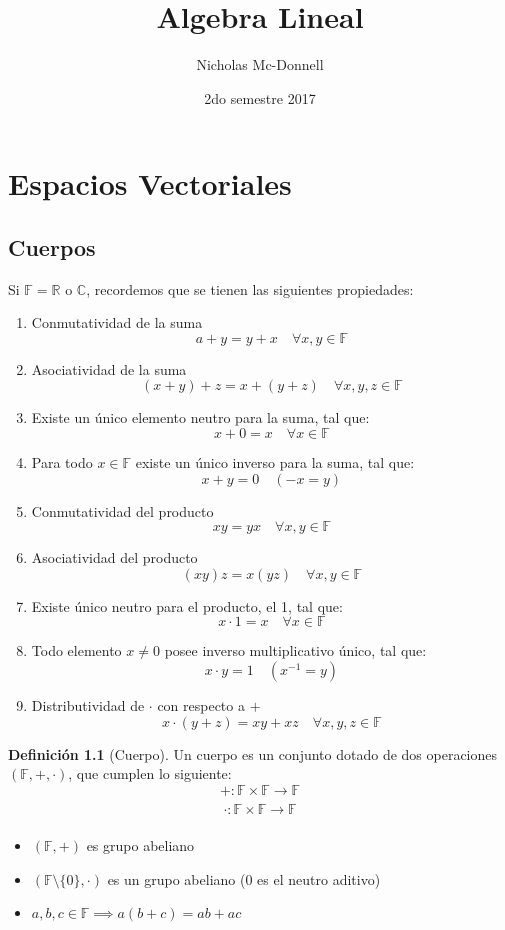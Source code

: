 \documentclass[11pt]{book}
\title{Algebra Lineal}
\author{Nicholas Mc-Donnell}
\date{2do semestre 2017}
\newcommand{\set}[1]{\mathbb{#1}}
\newcommand{\func}[5]{#1:#2\xrightarrow[#5]{#4}#3}
\theoremstyle{definition}
\newtheorem{defn}{Definición}[section]
\begin{document}
\maketitle
{}

\tableofcontents
{}
\chapter{Espacios Vectoriales}
\section{Cuerpos}
Si $\set{F}=\set{R}$ o $\set{C}$, recordemos que se tienen las siguientes propiedades:
\begin{enumerate}
	\item Conmutatividad de la suma
	      \[a+y=y+x\quad\forall x,y\in\set{F}\]

	\item Asociatividad de la suma
	      \[(x+y)+z=x+(y+z)\quad\forall x,y,z\in\set{F}\]

	\item Existe un único elemento neutro para la suma, tal que:
	      \[x+0=x\quad\forall x\in\set{F}\]

	\item Para todo $x\in\set{F}$ existe un único inverso para la suma, tal que:
	      \[x+y=0\quad (-x=y)\]

	\item Conmutatividad del producto
	      \[xy=yx\quad\forall x,y\in\set{F}\]

	\item Asociatividad del producto
	      \[(xy)z=x(yz)\quad\forall x,y\in\set{F}\]

	\item Existe único neutro para el producto, el 1, tal que:
	      \[x\cdot 1=x\quad\forall x\in\set{F}\]

	\item Todo elemento $x\neq 0$ posee inverso multiplicativo único, tal que:
	      \[x\cdot y=1\quad (x^{-1}=y)\]

	\item Distributividad de $\cdot$ con respecto a $+$
	      \[x\cdot (y+z)=xy+xz\quad\forall x,y,z\in\set{F}\]
\end{enumerate}
\begin{defn}[Cuerpo]
	Un cuerpo es un conjunto dotado de dos operaciones $(\set{F},+,\cdot)$, que cumplen lo siguiente:
	\[\func{+}{\set{F}\times\set{F}}{\set{F}}{}{}\]
	\[\func{\cdot}{\set{F}\times\set{F}}{\set{F}}{}{}\]
	\begin{itemize}
		\item $(\set{F},+)$ es grupo abeliano

		\item $(\set{F}\setminus\{0\},\cdot)$ es un grupo abeliano ($0$ es el neutro aditivo)

		\item $a,b,c\in\set{F}\implies a(b+c)=ab+ac$
	\end{itemize}
\end{defn}
\end{document}
